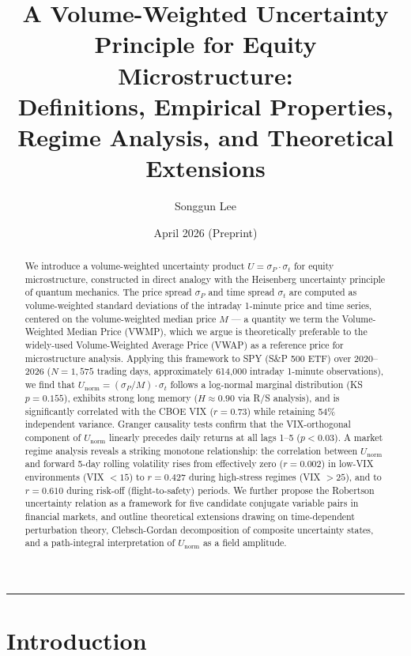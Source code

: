 \documentclass[11pt]{article}
\title{\textbf{A Volume-Weighted Uncertainty Principle for Equity Microstructure:\\
Definitions, Empirical Properties, Regime Analysis, and Theoretical Extensions}}
\author[1]{Songgun Lee}
\affil[1]{Department of Physics, University of California, Santa Barbara}
\date{April 2026 \quad (Preprint)}
\begin{document}
\maketitle

\begin{abstract}
\noindent
  We introduce a volume-weighted uncertainty product $U = \sigma_P \cdot \sigma_t$ for equity microstructure, constructed in direct analogy with the Heisenberg uncertainty principle of quantum mechanics. The price spread $\sigma_P$ and time spread $\sigma_t$ are computed as volume-weighted standard deviations of the intraday 1-minute price and time series, centered on the volume-weighted median price $M$ --- a quantity we term the Volume-Weighted Median Price (VWMP), which we argue is theoretically preferable to the widely-used Volume-Weighted Average Price (VWAP) as a reference price for microstructure analysis. Applying this framework to SPY (S\&P 500 ETF) over 2020--2026 ($N = 1{,}575$ trading days, approximately 614{,}000 intraday 1-minute observations), we find that $U_\mathrm{norm} = (\sigma_P/M)\cdot\sigma_t$ follows a log-normal marginal distribution (KS $p = 0.155$), exhibits strong long memory ($H \approx 0.90$ via R/S analysis), and is significantly correlated with the CBOE VIX ($r = 0.73$) while retaining 54\% independent variance. Granger causality tests confirm that the VIX-orthogonal component of $U_\mathrm{norm}$ linearly precedes daily returns at all lags 1--5 ($p < 0.03$). A market regime analysis reveals a striking monotone relationship: the correlation between $U_\mathrm{norm}$ and forward 5-day rolling volatility rises from effectively zero ($r = 0.002$) in low-VIX environments (VIX $< 15$) to $r = 0.427$ during high-stress regimes (VIX $> 25$), and to $r = 0.610$ during risk-off (flight-to-safety) periods. We further propose the Robertson uncertainty relation as a framework for five candidate conjugate variable pairs in financial markets, and outline theoretical extensions drawing on time-dependent perturbation theory, Clebsch-Gordan decomposition of composite uncertainty states, and a path-integral interpretation of $U_\mathrm{norm}$ as a field amplitude.
\end{abstract}

\noindent\rule{\textwidth}{0.4pt}
\vspace{1em}

\section{Introduction}
\end{document}
